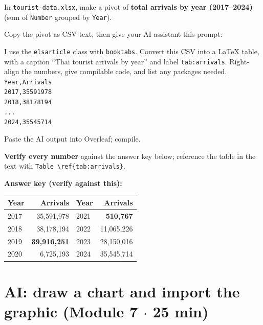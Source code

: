 \documentclass[11pt]{article}
\begin{document}
\begin{checklist}
\item In \texttt{tourist-data.xlsx}, make a pivot of \textbf{total arrivals by year (2017--2024)} (sum of \texttt{Number} grouped by \texttt{Year}).
\item Copy the pivot as CSV text, then give your AI assistant this prompt:
\end{checklist}

\begin{promptbox}
I use the \texttt{elsarticle} class with \texttt{booktabs}. Convert this CSV into a LaTeX table,
with a caption ``Thai tourist arrivals by year'' and label \texttt{tab:arrivals}. Right-align the
numbers, give compilable code, and list any packages needed.\\[2pt]
\texttt{Year,Arrivals\\2017,35591978\\2018,38178194\\...\\2024,35545714}
\end{promptbox}

\begin{checklist}
\item Paste the AI output into Overleaf; compile.
\item \textbf{Verify every number} against the answer key below; reference the table in the text with \texttt{Table~\textbackslash ref\{tab:arrivals\}}.
\end{checklist}

\textbf{Answer key (verify against this):}
\begin{center}\small
\begin{tabular}{@{}lr|lr@{}}
\toprule
Year & Arrivals & Year & Arrivals \\
\midrule
2017 & 35{,}591{,}978 & 2021 & \textbf{510{,}767} \\
2018 & 38{,}178{,}194 & 2022 & 11{,}065{,}226 \\
2019 & \textbf{39{,}916{,}251} & 2023 & 28{,}150{,}016 \\
2020 & 6{,}725{,}193 & 2024 & 35{,}545{,}714 \\
\bottomrule
\end{tabular}
\end{center}

\section{AI: draw a chart and import the graphic \hfill {\normalfont\small (Module 7 $\cdot$ 25 min)}}
\end{document}
